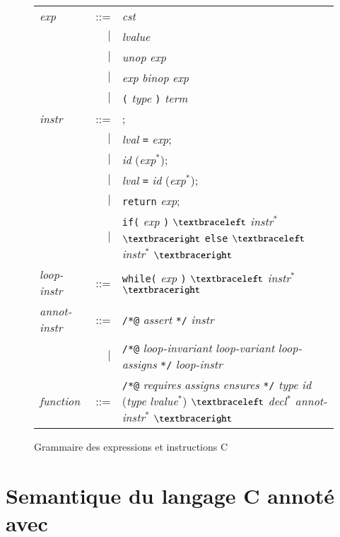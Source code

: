 \begin{figure}[tb]
  \begin{tabular}{lrl}
    \textit{exp} & ::= & \textit{cst} \\
    & $\mid$ & \textit{lvalue} \\
    & $\mid$ & \textit{unop} \textit{exp} \\
    & $\mid$ & \textit{exp} \textit{binop} \textit{exp} \\
    & $\mid$ & \lstinline'(' \textit{type} \lstinline')' \textit{term} \\
    \textit{instr} & ::= & ; \\
    & $\mid$ & \textit{lval} \lstinline'=' \textit{exp}; \\
    & $\mid$ & \textit{id} (\textit{exp}$^{*}$); \\
    & $\mid$ & \textit{lval} \lstinline'=' \textit{id} (\textit{exp}$^{*}$); \\
    & $\mid$ & \lstinline'return' \textit{exp}; \\
    & $\mid$ & \lstinline'if(' \textit{exp} \lstinline')'
    $\bopen$ \textit{instr}$^*$ $\bclose$
    \lstinline'else' $\bopen$ \textit{instr}$^*$ $\bclose$ \\
    \textit{loop-instr} & ::= & \lstinline'while(' \textit{exp} \lstinline')'
    $\bopen$ \textit{instr}$^*$ $\bclose$ \\
    \textit{annot-instr} & ::= & \lstinline'/*@' \textit{assert} \lstinline'*/'
    \textit{instr} \\
    & $\mid$ & \lstinline'/*@' \textit{loop-invariant} \textit{loop-variant}
    \textit{loop-assigns} \lstinline'*/' \textit{loop-instr} \\
    \textit{function} & ::= & \lstinline'/*@' \textit{requires} \textit{assigns}
    \textit{ensures} \lstinline'*/' \textit{type} \textit{id}
    (\textit{type} \textit{lvalue}$^{*}$)
    $\bopen$ \textit{decl}$^{*}$ \textit{annot-instr}$^{*}$
    $\bclose$
  \end{tabular}
  \caption{Grammaire des expressions et instructions C}
  \label{fig:gram-c}
\end{figure}



\section{Semantique du langage C annoté avec \eacsl}
\label{sec:semantics}


